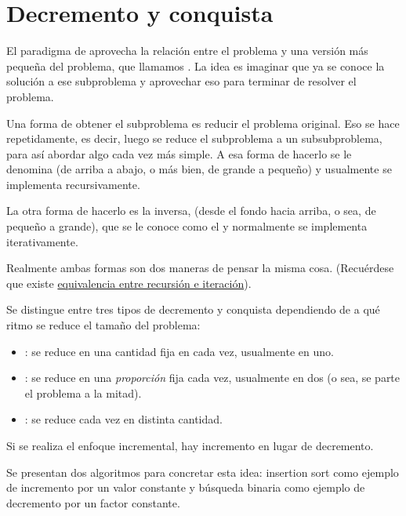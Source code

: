 \section{Decremento y conquista}

El paradigma de  aprovecha la relación entre el problema y una versión más pequeña del problema, que llamamos . La idea es imaginar que ya se conoce la solución a ese subproblema y aprovechar eso para terminar de resolver el problema.

Una forma de obtener el subproblema es reducir el problema original. Eso se hace repetidamente, es decir, luego se reduce el subproblema a un subsubproblema, para así abordar algo cada vez más simple. A esa forma de hacerlo se le denomina  (de arriba a abajo, o más bien, de grande a pequeño) y usualmente se implementa recursivamente.

La otra forma de hacerlo es la inversa,  (desde el fondo hacia arriba, o sea, de pequeño a grande), que se le conoce como el  y normalmente se implementa iterativamente.

Realmente ambas formas son dos maneras de pensar la misma cosa. (Recuérdese que existe \hyperref[sec:recursion_iteracion]{equivalencia entre recursión e iteración}).

Se distingue entre tres tipos de decremento y conquista dependiendo de a qué ritmo se reduce el tamaño del problema:
\begin{itemize}
    \item {}: se reduce en una cantidad fija en cada vez, usualmente en uno.
    \item {}: se reduce en una \emph{proporción} fija cada vez, usualmente en dos (o sea, se parte el problema a la mitad).
    \item {}: se reduce cada vez en distinta cantidad.
\end{itemize}
Si se realiza el enfoque incremental, hay incremento en lugar de decremento.

Se presentan dos algoritmos para concretar esta idea: insertion sort como ejemplo de incremento por un valor constante y búsqueda binaria como ejemplo de decremento por un factor constante.


